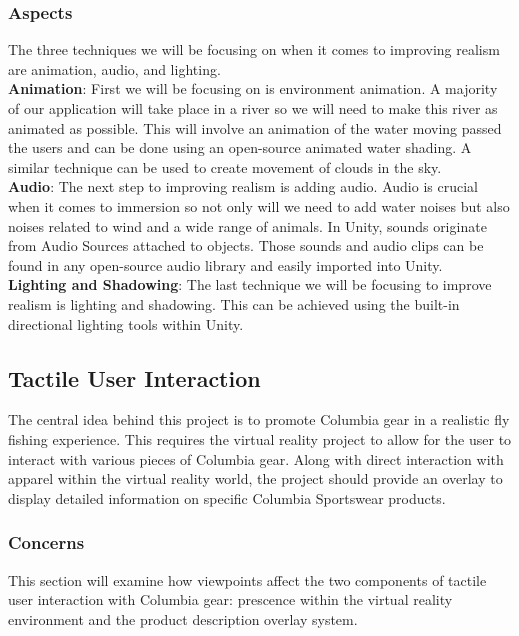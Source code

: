 \documentclass[10pt,journal,compsoc,onecolumn, draftclsnofoot]{IEEEtran}
\begin{document}
\subsubsection{Aspects}
The three techniques we will be focusing on when it comes to improving realism are animation, audio, and lighting. \\

\hangindent=0.5cm \textbf{Animation}: First we will be focusing on is environment animation. A majority of our application will take place in a river so we will need to make this river as animated as possible. This will involve an animation of the water moving passed the users and can be done using an open-source animated water shading. A similar technique can be used to create movement of clouds in the sky.\\

\hangindent=0.5cm \textbf{Audio}: The next step to improving realism is adding audio. Audio is crucial when it comes to immersion so not only will we need to add water noises but also noises related to wind and a wide range of animals. In Unity, sounds originate from Audio Sources attached to objects. Those sounds and audio clips can be found in any open-source audio library and easily imported into Unity. \\

\hangindent=0.5cm \textbf{Lighting and Shadowing}: The last technique we will be focusing to improve realism is lighting and shadowing. This can be achieved using the built-in directional lighting tools within Unity. \\

\subsection{Tactile User Interaction}
The central idea behind this project is to promote Columbia gear in a realistic fly fishing experience. This requires the virtual reality project to allow for the user to interact with various pieces of Columbia gear. Along with direct interaction with apparel within the virtual reality world, the project should provide an overlay to display detailed information on specific Columbia Sportswear products.

\subsubsection{Concerns}
This section will examine how viewpoints affect the two components of tactile user interaction with Columbia gear: prescence within the virtual reality environment and the product description overlay system.
\end{document}
